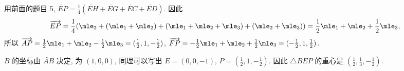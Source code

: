 \begin{solution}
\begin{figure}[htb]
    \end{figure}

    用前面的题目 5, $\lvec{EP} = \frac{1}{4}(\lvec{EH} + \lvec{EG} + \lvec{EC} + \lvec{ED})$. 因此
    \[
        \lvec{EP} = \frac{1}{4}(\mle_2 + (\mle_1 + \mle_2) + (\mle_1 + \mle_2 + \mle_3) + (\mle_2 + \mle_3)) = \frac{1}{2}\mle_1 + \mle_2 + \frac{1}{2}\mle_3,
    \]
    所以 $\lvec{AP} = \frac{1}{2}\mle_1 + \mle_2 - \frac{1}{2}\mle_3 = (\frac{1}{2}, 1, -\frac{1}{2})$, $\lvec{FP} = -\frac{1}{2}\mle_1 + \mle_2 + \frac{1}{2}\mle_3 = (-\frac{1}{2}, 1, \frac{1}{2})$.

    $B$ 的坐标由 $\lvec{AB}$ 决定, 为 $(1, 0, 0)$, 同理可以写出 $E = (0, 0, -1)$, $P = (\frac{1}{2}, 1, -\frac{1}{2})$. 因此 $\triangle BEP$ 的重心是 $(\frac{1}{2}, \frac{1}{3}, -\frac{1}{2})$.
\end{solution}